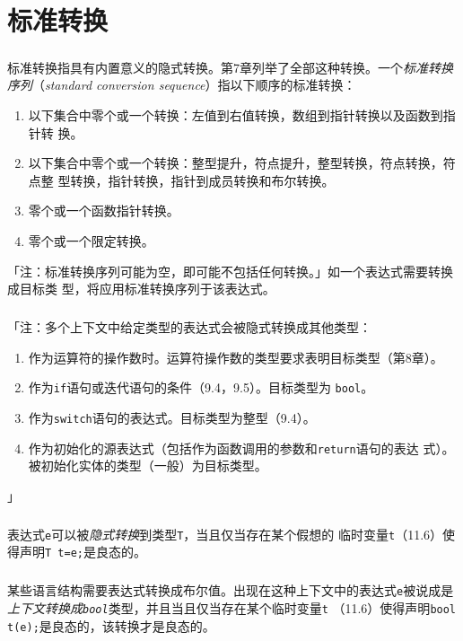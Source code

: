 \chapter{标准转换}

\paragraph{}
标准转换指具有内置意义的隐式转换。第7章列举了全部这种转换。一个\textit{标准转换
序列}（\textit{standard conversion sequence}）指以下顺序的标准转换：
\begin{enumerate}
  \item{以下集合中零个或一个转换：左值到右值转换，数组到指针转换以及函数到指针转
    换。}
  \item{以下集合中零个或一个转换：整型提升，符点提升，整型转换，符点转换，符点整
    型转换，指针转换，指针到成员转换和布尔转换。}
  \item{零个或一个函数指针转换。}
  \item{零个或一个限定转换。}
\end{enumerate}
「注：标准转换序列可能为空，即可能不包括任何转换。」如一个表达式需要转换成目标类
型，将应用标准转换序列于该表达式。

\paragraph{}
「注：多个上下文中给定类型的表达式会被隐式转换成其他类型：
\begin{enumerate}
  \item{作为运算符的操作数时。运算符操作数的类型要求表明目标类型（第8章）。}
  \item{作为\texttt{if}语句或迭代语句的条件（9.4，9.5）。目标类型为
    \texttt{bool}。}
  \item{作为\texttt{switch}语句的表达式。目标类型为整型（9.4）。}
  \item{作为初始化的源表达式（包括作为函数调用的参数和\texttt{return}语句的表达
    式）。被初始化实体的类型（一般）为目标类型。}
\end{enumerate}」

\paragraph{}
表达式\texttt{e}可以被\textit{隐式转换}到类型\texttt{T}，当且仅当存在某个假想的
临时变量\texttt{t}（11.6）使得声明\texttt{T t=e;}是良态的。

\paragraph{}
某些语言结构需要表达式转换成布尔值。出现在这种上下文中的表达式\texttt{e}被说成是
\textit{上下文转换成\texttt{bool}}类型，并且当且仅当存在某个临时变量\texttt{t}
（11.6）使得声明\texttt{bool t(e);}是良态的，该转换才是良态的。

